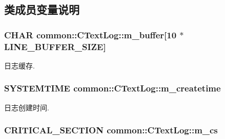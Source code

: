 \subsection{类成员变量说明}
\hypertarget{classcommon_1_1_c_text_log_a404b1bc0f4585481dfccb0b73fe4d388}{
\subsubsection[{m\+\_\+buffer}]{\setlength{\rightskip}{0pt plus 5cm}C\+H\+A\+R common\+::\+C\+Text\+Log\+::m\+\_\+buffer\mbox{[}10 $\ast${\bf L\+I\+N\+E\+\_\+\+B\+U\+F\+F\+E\+R\+\_\+\+S\+I\+Z\+E}\mbox{]}\hspace{0.3cm}{\ttfamily [private]}}}\label{classcommon_1_1_c_text_log_a404b1bc0f4585481dfccb0b73fe4d388}


日志缓存. 

\hypertarget{classcommon_1_1_c_text_log_ab60caf7016e093cc7276e27a3a60f22d}{
\subsubsection[{m\+\_\+createtime}]{\setlength{\rightskip}{0pt plus 5cm}S\+Y\+S\+T\+E\+M\+T\+I\+M\+E common\+::\+C\+Text\+Log\+::m\+\_\+createtime\hspace{0.3cm}{\ttfamily [private]}}}\label{classcommon_1_1_c_text_log_ab60caf7016e093cc7276e27a3a60f22d}


日志创建时间. 

\hypertarget{classcommon_1_1_c_text_log_a674dc6bfc676698846a7f8fee11f2e83}{
\subsubsection[{m\+\_\+cs}]{\setlength{\rightskip}{0pt plus 5cm}C\+R\+I\+T\+I\+C\+A\+L\+\_\+\+S\+E\+C\+T\+I\+O\+N common\+::\+C\+Text\+Log\+::m\+\_\+cs\hspace{0.3cm}{\ttfamily [private]}}}\label{classcommon_1_1_c_text_log_a674dc6bfc676698846a7f8fee11f2e83}


